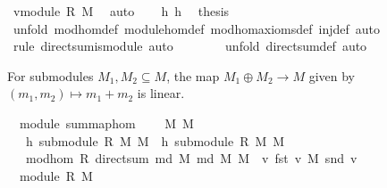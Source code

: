 \begin{isabellebody}
\ v{}{\isacharcolon}module\ R\ M{}\ \isamarkupfalse%
\ auto\isanewline
\ \ \isamarkupfalse%
\ h{}\ h{}\ \isamarkupfalse%
\ {\isacharquery}thesis\isanewline
\ \ \ \ \isamarkupfalse%
\ {\isacharparenleft}unfold\ mod{\isacharunderscore}hom{\isacharunderscore}def\ module{\isacharunderscore}hom{\isacharunderscore}def\ mod{\isacharunderscore}hom{\isacharunderscore}axioms{\isacharunderscore}def\ inj{}{\isacharunderscore}def{\isacharcomma}\ auto{\isacharparenright}\isanewline
\ \ \ \ \ \ \ \isamarkupfalse%
\ {\isacharparenleft}rule\ direct{\isacharunderscore}sum{\isacharunderscore}is{\isacharunderscore}module{\isacharcomma}\ auto{\isacharparenright}\isanewline
\ \ \ \ \ \ \isamarkupfalse%
\ {\isacharparenleft}unfold\ direct{\isacharunderscore}sum{\isacharunderscore}def{\isacharcomma}\ auto{\isacharparenright}\isanewline
{}\isamarkupfalse%
%
\endisatagproof
{\isafoldproof}%
%
\isadelimproof
%
\endisadelimproof
%
\begin{isamarkuptext}%
For submodules $M_1,M_2\subseteq M$, the map $M_1\oplus M_2\to M$ given by $(m_1,m_2)\mapsto 
m_1+m_2$ is linear.%
\end{isamarkuptext}%
\isamarkuptrue%
\isamarkupfalse%
\ {\isacharparenleft}\ module{\isacharparenright}\ sum{\isacharunderscore}map{\isacharunderscore}hom{\isacharcolon}\ \isanewline
\ \ \ M{}\ M{}\isanewline
\ \ \ h{}{\isacharcolon}\ {\isachardoublequoteopen}submodule\ R\ M{}\ M{\isachardoublequoteclose}\ \ h{}{\isacharcolon}\ {\isachardoublequoteopen}submodule\ R\ M{}\ M{\isachardoublequoteclose}\isanewline
\ \ \ {\isachardoublequoteopen}mod{\isacharunderscore}hom\ R\ {\isacharparenleft}direct{\isacharunderscore}sum\ {\isacharparenleft}md\ M{}{\isacharparenright}\ {\isacharparenleft}md\ M{}{\isacharparenright}{\isacharparenright}\ M\ {\isacharparenleft}{\isasymlambda}\ v{\isachardot}\ {\isacharparenleft}fst\ v{\isacharparenright}\ {\isasymoplus}\isactrlbsub M\isactrlesub \ {\isacharparenleft}snd\ v{\isacharparenright}{\isacharparenright}{\isachardoublequoteclose}\isanewline
%
\isadelimproof
%
\endisadelimproof
%
\isatagproof
{}\isamarkupfalse%
\ {\isacharminus}\ \isanewline
\ \ \isamarkupfalse%
\ {}{\isacharcolon}\ {\isachardoublequoteopen}module\ R\ M{\isachardoublequoteclose}\isacommand{{\isachardot}{\isachardot}}\isamarkupfalse%

\end{isabellebody}
